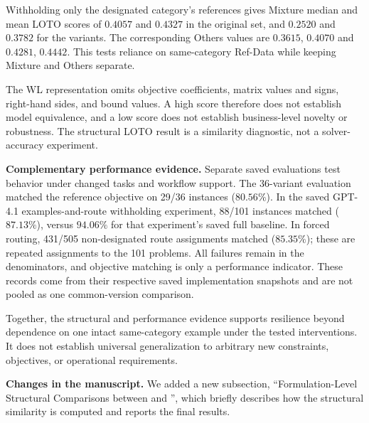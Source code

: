 Withholding only the designated category's references gives Mixture
median and mean LOTO scores of $0.4057$ and $0.4327$ in the original set,
and $0.2520$ and $0.3782$ for the variants. The corresponding Others
values are $0.3615$, $0.4070$ and $0.4281$, $0.4442$. This tests reliance
on same-category Ref-Data while keeping Mixture and Others separate.

The WL representation omits objective coefficients, matrix values and
signs, right-hand sides, and bound values. A high score therefore does
not establish model equivalence, and a low score does not establish
business-level novelty or robustness. The structural LOTO result is a
similarity diagnostic, not a solver-accuracy experiment.

\medskip
\textbf{Complementary performance evidence.}
Separate saved evaluations test behavior under changed tasks and
workflow support. The 36-variant evaluation matched the reference
objective on 29/36 instances ($80.56\%$). In the saved GPT-4.1
examples-and-route withholding experiment, 88/101 instances matched
($87.13\%$), versus $94.06\%$ for that experiment's saved full baseline.
In forced routing, 431/505 non-designated route assignments matched
($85.35\%$); these are repeated assignments to the 101 problems. All
failures remain in the denominators, and objective matching is only a
performance indicator. These records come from their respective saved
implementation snapshots and are not pooled as one common-version
comparison.

Together, the structural and performance evidence supports resilience
beyond dependence on one intact same-category example under the tested
interventions. It does not establish universal generalization to
arbitrary new constraints, objectives, or operational requirements.

\medskip
\textbf{Changes in the manuscript.}
We added a new subsection, ``Formulation-Level Structural Comparisons
between  and \testdata{}'', which briefly describes how the
structural similarity is computed and reports the final results.
\endgroup

\begingroup\color{blue}

